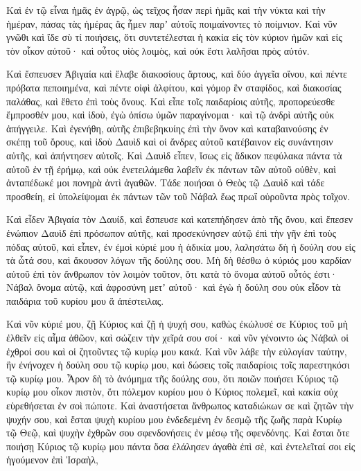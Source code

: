 {Καὶ ἐν τῷ εἶναι ἡμᾶς ἐν ἀγρῷ, ὡς τεῖχος ἦσαν περὶ ἡμᾶς καὶ τὴν νύκτα καὶ τὴν ἡμέραν, πάσας τὰς ἡμέρας ἃς ἦμεν παρʼ αὐτοῖς ποιμαίνοντες τὸ ποίμνιον.
Καὶ νῦν γνῶθι καὶ ἴδε σὺ τί ποιήσεις, ὅτι συντετέλεσται ἡ κακία εἰς τὸν κύριον ἡμῶν καὶ εἰς τὸν οἶκον αὐτοῦ· καὶ οὗτος υἱὸς λοιμὸς, καὶ οὐκ ἔστι λαλῆσαι πρὸς αὐτόν.
\par }{\PP {}Καὶ ἔσπευσεν Ἀβιγαία καὶ ἔλαβε διακοσίους ἄρτους, καὶ δύο ἀγγεῖα οἴνου, καὶ πέντε πρόβατα πεποιημένα, καὶ πέντε οἰφὶ ἀλφίτου, καὶ γόμορ ἓν σταφίδος, καὶ διακοσίας παλάθας, καὶ ἔθετο ἐπὶ τοὺς ὄνους.
Καὶ εἶπε τοῖς παιδαρίοις αὐτῆς, προπορεύεσθε ἔμπροσθέν μου, καὶ ἰδοὺ, ἐγὼ ὀπίσω ὑμῶν παραγίνομαι· καὶ τῷ ἀνδρὶ αὐτῆς οὐκ ἀπήγγειλε.
Καὶ ἐγενήθη, αὐτῆς ἐπιβεβηκυίης ἐπὶ τὴν ὄνον καὶ καταβαινούσης ἐν σκέπῃ τοῦ ὄρους, καὶ ἰδοὺ Δαυὶδ καὶ οἱ ἄνδρες αὐτοῦ κατέβαινον εἰς συνάντησιν αὐτῆς, καὶ ἀπήντησεν αὐτοῖς.
Καὶ Δαυὶδ εἶπεν, ἴσως εἰς ἄδικον πεφύλακα πάντα τὰ αὐτοῦ ἐν τῇ ἐρήμῳ, καὶ οὐκ ἐνετειλάμεθα λαβεῖν ἐκ πάντων τῶν αὐτοῦ οὐθὲν, καὶ ἀνταπέδωκέ μοι πονηρὰ ἀντὶ ἀγαθῶν.
Τάδε ποιήσαι ὁ Θεὸς τῷ Δαυὶδ καὶ τάδε προσθείη, εἰ ὑπολείψομαι ἐκ πάντων τῶν τοῦ Νάβαλ ἕως πρωΐ οὐροῦντα πρὸς τοῖχον.
\par }{\PP {}Καὶ εἶδεν Ἀβιγαία τὸν Δαυίδ, καὶ ἔσπευσε καὶ κατεπήδησεν ἀπὸ τῆς ὄνου, καὶ ἔπεσεν ἐνώπιον Δαυὶδ ἐπὶ πρόσωπον αὐτῆς, καὶ προσεκύνησεν αὐτῷ ἐπὶ τὴν γῆν
ἐπὶ τοὺς πόδας αὐτοῦ, καὶ εἶπεν, ἐν ἐμοὶ κύριέ μου ἡ ἀδικία μου, λαλησάτω δὴ ἡ δούλη σου εἰς τὰ ὦτά σου, καὶ ἄκουσον λόγων τῆς δούλης σου.
Μὴ δὴ θέσθω ὁ κύριός μου καρδίαν αὐτοῦ ἐπὶ τὸν ἄνθρωπον τὸν λοιμὸν τοῦτον, ὅτι κατὰ τὸ ὄνομα αὐτοῦ οὗτός ἐστι· Νάβαλ ὄνομα αὐτῷ, καὶ ἀφροσύνη μετʼ αὐτοῦ· καὶ ἐγὼ ἡ δούλη σου οὐκ εἶδον τὰ παιδάρια τοῦ κυρίου μου ἃ ἀπέστειλας.
\par }{\PP {}Καὶ νῦν κύριέ μου, ζῇ Κύριος καὶ ζῇ ἡ ψυχή σου, καθὼς ἐκώλυσέ σε Κύριος τοῦ μὴ ἐλθεῖν εἰς αἷμα ἀθῶον, καὶ σώζειν τὴν χεῖρά σου σοί· καὶ νῦν γένοιντο ὡς Νάβαλ οἱ ἐχθροί σου καὶ οἱ ζητοῦντες τῷ κυρίῳ μου κακά.
Καὶ νῦν λάβε τὴν εὐλογίαν ταύτην, ἣν ἐνήνοχεν ἡ δούλη σου τῷ κυρίῳ μου, καὶ δώσεις τοῖς παιδαρίοις τοῖς παρεστηκόσι τῷ κυρίῳ μου.
Ἆρον δὴ τὸ ἀνόμημα τῆς δούλης σου, ὅτι ποιῶν ποιήσει Κύριος τῷ κυρίῳ μου οἶκον πιστὸν, ὅτι πόλεμον κυρίου μου ὁ Κύριος πολεμεῖ, καὶ κακία οὐχ εὑρεθήσεται ἐν σοὶ πώποτε.
Καὶ ἀναστήσεται ἄνθρωπος καταδιώκων σε καὶ ζητῶν τὴν ψυχήν σου, καὶ ἔσται ψυχὴ κυρίου μου ἐνδεδεμένη ἐν δεσμῷ τῆς ζωῆς παρὰ Κυρίῳ τῷ Θεῷ, καὶ ψυχὴν ἐχθρῶν σου σφενδονήσεις ἐν μέσῳ τῆς σφενδόνης.
Καὶ ἔσται ὅτε ποιήσῃ Κύριος τῷ κυρίῳ μου πάντα ὅσα ἐλάλησεν ἀγαθὰ ἐπὶ σὲ, καὶ ἐντελεῖταί σοι εἰς ἡγούμενον ἐπὶ Ἰσραὴλ,
}
